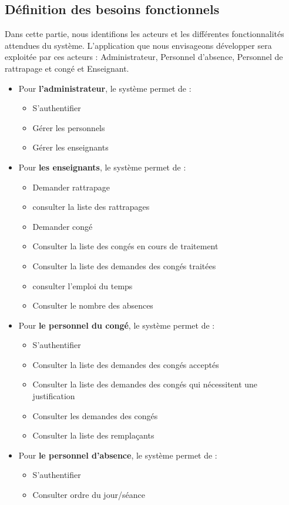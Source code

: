 \documentclass[12 pt]{report}
\begin{document}
\subsection{Définition des besoins fonctionnels}
Dans cette partie, nous identifions les acteurs et les différentes fonctionnalités attendues du système. L’application que nous envisageons développer sera exploitée par ces acteurs : Administrateur, Personnel d’absence, Personnel de rattrapage et congé et Enseignant.
\begin{itemize}[font=\color{black} \Large, label=]
\item  	Pour \textbf{l’administrateur}, le système permet de :
\begin{itemize}[font=\color{black} \Large, label=]
\item S’authentifier
\item Gérer les personnels
\item	Gérer les enseignants
\end{itemize}
\newpage
\item  	Pour \textbf{les enseignants}, le système permet de :
\begin{itemize}[font=\color{black} \Large, label=]
\item 	Demander rattrapage
\item consulter la liste des rattrapages
\item 	Demander congé
\item Consulter la liste des congés en cours de traitement
	\item Consulter la liste des demandes des congés traitées
		
		\item consulter l'emploi du temps

\item Consulter le nombre des absences
\end{itemize}




\item Pour\textbf{ le personnel du congé}, le système permet de : 
\begin{itemize}[font=\color{black} \Large, label=]

\item S’authentifier
\item 	Consulter la liste des demandes des congés acceptés
\item 	Consulter la liste des demandes des congés qui nécessitent une justification
\item Consulter les demandes des congés
\item 	Consulter la liste des remplaçants

\end{itemize}
\item  	Pour \textbf{ le personnel d’absence}, le système permet de : 
\begin{itemize}[font=\color{black} \Large, label=]
\item S’authentifier
\item Consulter ordre du jour/séance

\end{itemize}

\end{itemize}
\end{document}
